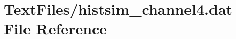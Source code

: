 \hypertarget{TextFiles_2histsim__channel4_8dat}{}\section{Text\+Files/histsim\+\_\+channel4.dat File Reference}
\label{TextFiles_2histsim__channel4_8dat}
